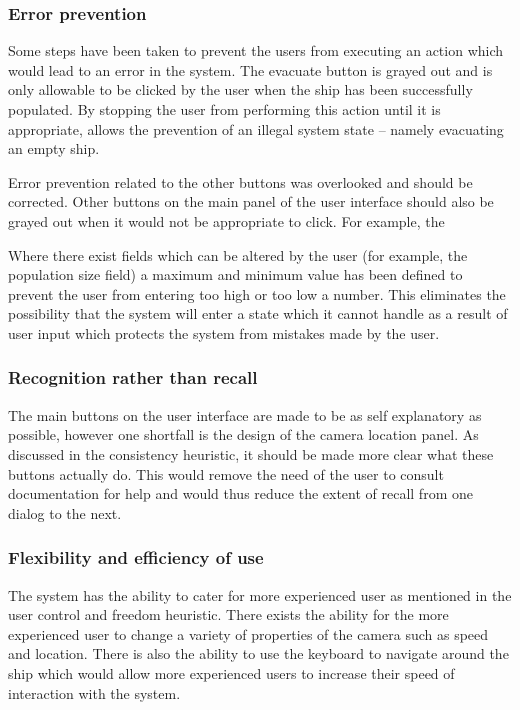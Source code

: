 \subsubsection{Error prevention}
Some steps have been taken to prevent the users from executing an action which would lead to an error in the system. The evacuate button is grayed out and is only allowable to be clicked by the user when the ship has been successfully populated. By stopping the user from performing this action until it is appropriate, allows the prevention of an illegal system state -- namely evacuating an empty ship.

Error prevention related to the other buttons was overlooked and should be corrected. Other buttons on the main panel of the user interface should also be grayed out when it would not be appropriate to click. For example, the

Where there exist fields which can be altered by the user (for example, the population size field) a maximum and minimum value has been defined to prevent the user from entering too high or too low a number. This eliminates the possibility that the system will enter a state which it cannot handle as a result of user input which protects the system from mistakes made by the user.

\subsubsection{Recognition rather than recall}
The main buttons on the user interface are made to be as self explanatory as possible, however one shortfall is the design of the camera location panel. As discussed in the consistency heuristic, it should be made more clear what these buttons actually do. This would remove the need of the user to consult documentation for help and would thus reduce the extent of recall from one dialog to the next.

\subsubsection{Flexibility and efficiency of use}
The system has the ability to cater for more experienced user as mentioned in the user control and freedom heuristic. There exists the ability for the more experienced user to change a variety of properties of the camera such as speed and location. There is also the ability to use the keyboard to navigate around the ship which would allow more experienced users to increase their speed of interaction with the system.

